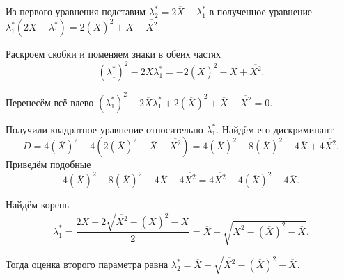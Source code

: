 Из первого уравнения подставим $ \lambda_2^* = 2 \overline{X} - \lambda_1^*$ в полученное уравнение
$ \lambda_1^* \left( 2 \overline{X} - \lambda_1^* \right) =
  2 \left( \overline{X} \right)^2 + \overline{X} - \overline{X^2}$.

Раскроем скобки и поменяем знаки в обеих частях
$$ \left( \lambda_1^* \right)^2 - 2 \overline{X} \lambda_1^* =
  -2 \left( \overline{X} \right)^2 - \overline{X} + \overline{X^2}.$$

Перенесём всё влево
$ \left( \lambda_1^* \right)^2 -
  2 \overline{X} \lambda_1^* +
  2 \left( \overline{X} \right)^2 +
  \overline{X} -
  \overline{X^2} =
  0$.

Получили квадратное уравнение относительно $ \lambda_1^*$.
Найдём его дискриминант
$$D =
  4 \left( \overline{X} \right)^2 -
  4 \left( 2 \left( \overline{X} \right)^2 + \overline{X} - \overline{X^2} \right) =
  4 \left( \overline{X} \right)^2 -
  8 \left( \overline{X} \right)^2 -
  4 \overline{X} +
  4 \overline{X^2}.$$
Приведём подобные
$$4 \left( \overline{X} \right)^2 -
  8 \left( \overline{X} \right)^2 -
  4 \overline{X} +
  4 \overline{X^2} =
  4 \overline{X^2} - 4 \left( \overline{X} \right)^2 - 4 \overline{X}.$$

Найдём корень
$$ \lambda_1^* =
  \frac{2 \overline{X} - 2 \sqrt{ \overline{X^2} - \left( \overline{X} \right)^2 - \overline{X}}}{2} =
  \overline{X} - \sqrt{ \overline{X^2} - \left( \overline{X} \right)^2 - \overline{X}}.$$

Тогда оценка второго параметра равна
$ \lambda_2^* =
  \overline{X} + \sqrt{ \overline{X^2} - \left( \overline{X} \right)^2 - \overline{X}}$.
